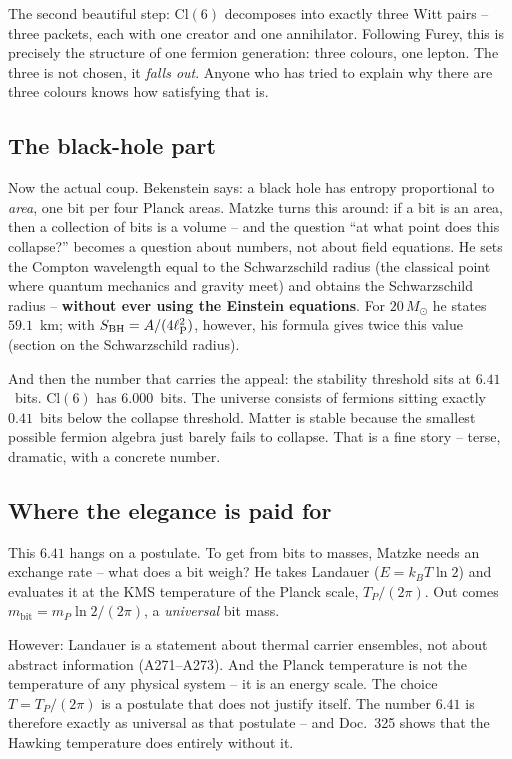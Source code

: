 The second beautiful step: $\mathrm{Cl}(6)$ decomposes into exactly
three Witt pairs -- three packets, each with one creator and one
annihilator. Following Furey, this is precisely the structure of one
fermion generation: three colours, one lepton. The three is not chosen,
it \emph{falls out}. Anyone who has tried to explain why there are three
colours knows how satisfying that is.

\subsection*{The black-hole part}

Now the actual coup. Bekenstein says: a black hole has entropy
proportional to \emph{area}, one bit per four Planck areas. Matzke turns
this around: if a bit is an area, then a collection of bits is a volume --
and the question \enquote{at what point does this collapse?} becomes a
question about numbers, not about field equations. He sets the Compton
wavelength equal to the Schwarzschild radius (the classical point where
quantum mechanics and gravity meet) and obtains the Schwarzschild radius --
\textbf{without ever using the Einstein equations}.
For $20\,M_\odot$ he states $59.1$~km; with $S_{\mathrm{BH}} = A/(4\ell_{\mathrm{P}}^2)$, however, his
formula gives twice this value (section on the Schwarzschild radius).

And then the number that carries the appeal: the stability threshold sits
at $6.41$~bits. $\mathrm{Cl}(6)$ has $6.000$~bits. The universe consists
of fermions sitting exactly $0.41$~bits below the collapse threshold.
Matter is stable because the smallest possible fermion algebra just
barely fails to collapse. That is a fine story -- terse, dramatic, with a
concrete number.

\subsection*{Where the elegance is paid for}

This $6.41$ hangs on a postulate. To get from bits to masses, Matzke needs
an exchange rate -- what does a bit weigh? He takes Landauer
($E = k_BT\ln 2$) and evaluates it at the KMS temperature of the Planck scale, $T_P/(2\pi)$. Out comes
$m_{\mathrm{bit}} = m_P\ln 2/(2\pi)$, a \emph{universal} bit mass.

However: Landauer is a statement about thermal carrier ensembles, not
about abstract information (A271--A273). And the Planck temperature is not
the temperature of any physical system -- it is an energy scale. The choice
$T = T_P/(2\pi)$ is a postulate that does not justify itself. The number $6.41$ is
therefore exactly as universal as that postulate -- and Doc.~325 shows that
the Hawking temperature does entirely without it.

